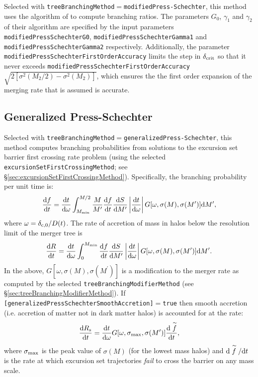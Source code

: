 Selected with {\tt treeBranchingMethod}$=${\tt modifiedPress-Schechter}, this method uses the algorithm of \cite{parkinson_generating_2008} to compute branching ratios. The parameters $G_0$, $\gamma_1$ and $\gamma_2$ of their algorithm are specified by the input parameters {\tt modifiedPressSchechterG0}, {\tt modifiedPressSchechterGamma1} and {\tt modifiedPressSchechterGamma2} respectively. Additionally, the parameter {\tt modifiedPressSchechterFirstOrderAccuracy} limits the step in $\delta_{\rm crit}$ so that it never exceeds {\tt modifiedPressSchechterFirstOrderAccuracy}$\sqrt{2[\sigma^2(M_2/2)-\sigma^2(M_2)]}$, which ensures the the first order expansion of the merging rate that is assumed is accurate.

\subsection{Generalized Press-Schechter}

Selected with {\tt treeBranchingMethod}$=${\tt generalizedPress-Schechter}, this method computes branching probabilities from solutions to the excursion set barrier first crossing rate problem (using the selected {\tt excursionSetFirstCrossingMethod}; see \S\ref{sec:excursionSetFirstCrossingMethod}). Specifically, the branching probability per unit time is:
\begin{equation}
 {\d f \over \d t} = {{\rm d} t \over {\rm d}\omega} \int_{M_{\rm min}}^{M/2} {M \over M^\prime} {\d f \over \d t} {\d S \over \d M^\prime} \left| {\d t \over \d \omega}\right| G[\omega,\sigma(M),\sigma(M^\prime)] \d M^\prime,
\end{equation}
where $\omega = \delta_{\rm c,0}/D(t)$. The rate of accretion of mass in halos below the resolution limit of the merger tree is
\begin{equation}
 {\d R \over \d t} =  {{\rm d} t \over {\rm d}\omega} \int_0^{M_{\rm min}} {\d f \over \d t} {\d S \over \d M^\prime} \left| {\d t \over \d \omega}\right| G[\omega,\sigma(M),\sigma(M^\prime)] \d M^\prime.
\end{equation}
In the above, $G[\omega,\sigma(M),\sigma(M^\prime)]$ is a modification to the merger rate as computed by the selected {\tt treeBranchingModifierMethod} (see \S\ref{sec:treeBranchingModifierMethod}). If {\tt [generalizedPressSchechterSmoothAccretion]}$=${\tt true} then smooth accretion (i.e. accretion of matter not in dark matter halos) is accounted for at the rate:
\begin{equation}
 {\d R_{\rm s} \over \d t} =  {{\rm d} t \over {\rm d}\omega} G[\omega,\sigma_{\rm max},\sigma(M^\prime)] {\d \stackrel{\sim}{f} \over \d t},
\end{equation}
where $\sigma_{\rm max}$ is the peak value of $\sigma(M)$ (for the lowest mass halos) and $\d \stackrel{\sim}{f}/\d t$ is the rate at which excursion set trajectories \emph{fail} to cross the barrier on any mass scale.

